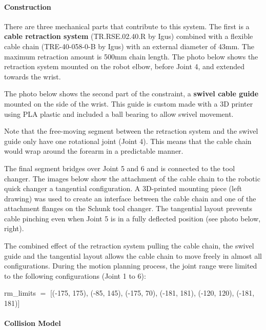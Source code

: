 \paragraph{Construction}

There are three mechanical parts that contribute to this system. The first is a \textbf{cable retraction system} (TR.RSE.02.40.R by Igus) combined with a flexible cable chain (TRE-40-058-0-B by Igus) with an external diameter of 43mm. The maximum retraction amount is 500mm chain length. The photo below shows the retraction system mounted on the robot elbow, before Joint 4, and extended towards the wrist.





The photo below shows the second part of the constraint, a \textbf{swivel cable guide} mounted on the side of the wrist. This guide is custom made with a 3D printer using PLA plastic and included a ball bearing to allow swivel movement. 

Note that the free-moving segment between the retraction system and the swivel guide only have one rotational joint (Joint 4). This means that the cable chain would wrap around the forearm in a predictable manner. 



The final segment bridges over Joint 5 and 6 and is connected to the tool changer. The images below show the attachment of the cable chain to the robotic quick changer a tangential configuration. A 3D-printed mounting piece (left drawing) was used to create an interface between the cable chain and one of the attachment flanges on the Schunk tool changer. The tangential layout prevents cable pinching even when Joint 5 is in a fully deflected position (see photo below, right). 

The combined effect of the retraction system pulling the cable chain, the swivel guide and the tangential layout allows the cable chain to move freely in almost all configurations. During the motion planning process, the joint range were limited to the following configurations (Joint 1 to 6):

{\footnotesize rm\_limits $=$ [(-175, 175), (-85, 145), (-175, 70), (-181, 181), (-120, 120), (-181, 181)]}





\paragraph{Collision Model}

